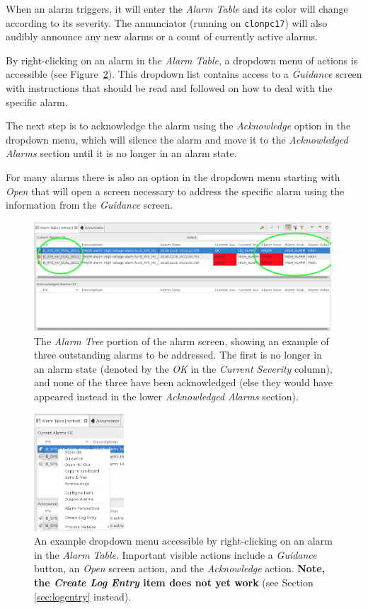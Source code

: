 \documentclass[amsmath,amssymb,notitlepage,11pt]{revtex4}
\begin{document}
When an alarm triggers, it will enter the {\em Alarm Table} and its color will change according to its severity.  The annunciator (running on \texttt{clonpc17}) will also audibly announce any new alarms or a count of currently active alarms.

By right-clicking on an alarm in the {\em Alarm Table}, a dropdown menu of actions is accessible (see Figure~\ref{fig:alarmguide}).  This dropdown list contains access to a {\em Guidance} screen with instructions that should be read and followed on how to deal with the specific alarm.  

The next step is to acknowledge the alarm using the {\em Acknowledge} option in the dropdown menu, which will silence the alarm and move it to the {\em Acknowledged Alarms} section until it is no longer in an alarm state.  

For many alarms there is also an option in the dropdown menu starting with {\em Open} that will open a screen necessary to address the specific alarm using the information from the {\em Guidance} screen.

\begin{figure}[htbp]\centering
  \includegraphics[width=0.99\textwidth]{pics/alarmtree}
  \caption{The {\em Alarm Tree} portion of the alarm screen, showing an example of three outstanding alarms to be addressed.  The first is no longer in an alarm state (denoted by the {\em OK} in the {\em Current Severity} column), and none of the three have been acknowledged (else they would have appeared instead in the lower {\em Acknowledged Alarms} section).\label{fig:alarmtable}}
\end{figure}
\begin{figure}[htbp]\centering
  \includegraphics[width=0.3\textwidth]{pics/alarmguide}
  \caption{An example dropdown menu accessible by right-clicking on an alarm in the {\em Alarm Table}.  Important visible actions include a {\em Guidance} button, an {\em Open} screen action, and the {\em Acknowledge} action.  {\bf Note, the {\em Create Log Entry} item does not yet work} (see Section \ref{sec:logentry} instead).\label{fig:alarmguide}}
\end{figure}
\end{document}
